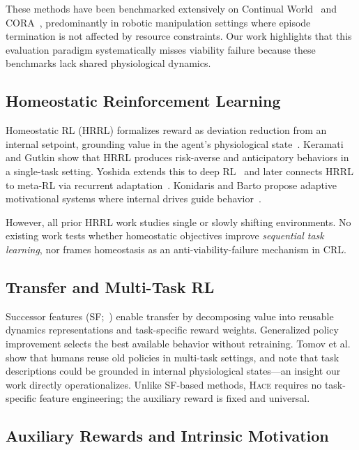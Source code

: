 \documentclass{article}
\newcommand{\hace}{\textsc{Hace}}
\begin{document}
These methods have been benchmarked extensively on Continual
World~\cite{continualworld2021} and CORA~\cite{cora2022}, predominantly
in robotic manipulation settings where episode termination is not
affected by resource constraints. Our work highlights that this evaluation
paradigm systematically misses viability failure because these benchmarks
lack shared physiological dynamics.

\subsection{Homeostatic Reinforcement Learning}

Homeostatic RL (HRRL) formalizes reward as deviation reduction from an
internal setpoint, grounding value in the agent's physiological
state~\cite{keramati2014}. Keramati and Gutkin show that HRRL produces
risk-averse and anticipatory behaviors in a single-task setting. Yoshida
extends this to deep RL~\cite{yoshida2018} and later connects HRRL to
meta-RL via recurrent adaptation~\cite{Yoshida}. Konidaris and Barto
propose adaptive motivational systems where internal drives guide
behavior~\cite{konidaris2006}.

However, all prior HRRL work studies single or slowly shifting
environments. No existing work tests whether homeostatic objectives
improve \emph{sequential task learning}, nor frames homeostasis as
an anti-viability-failure mechanism in CRL.

\subsection{Transfer and Multi-Task RL}

Successor features (SF;~\cite{Barreto}) enable transfer by decomposing
value into reusable dynamics representations and task-specific reward
weights. Generalized policy improvement selects the best available
behavior without retraining. Tomov et al.~\cite{Tomov} show that humans
reuse old policies in multi-task settings, and note that task descriptions
could be grounded in internal physiological states—an insight our work
directly operationalizes. Unlike SF-based methods, \hace{} requires no
task-specific feature engineering; the auxiliary reward is fixed and
universal.

\subsection{Auxiliary Rewards and Intrinsic Motivation}
\end{document}
